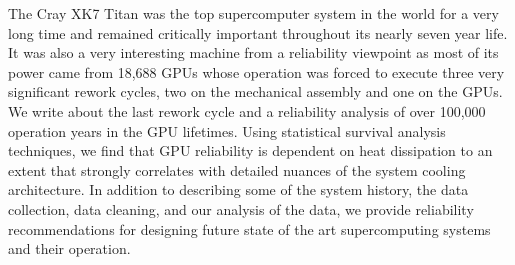 
The Cray XK7 Titan was the top supercomputer system in the world for a
very long time and remained critically important throughout its nearly
seven year life. It was also a very interesting machine from a
reliability viewpoint as most of its power came from 18,688 GPUs whose
operation was forced to execute three very significant rework cycles,
two on the mechanical assembly and one on the GPUs. We write about the
last rework cycle and a reliability analysis of over 100,000 operation
years in the GPU lifetimes. Using statistical survival analysis
techniques, we find that GPU reliability is dependent on heat
dissipation to an extent that strongly correlates with detailed
nuances of the system cooling architecture. In addition to describing
some of the system history, the data collection, data cleaning, and
our analysis of the data, we provide reliability recommendations for
designing future state of the art supercomputing systems and their
operation.
